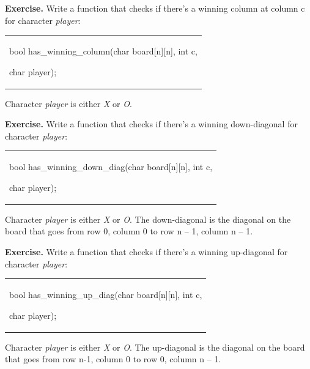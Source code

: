 \textbf{Exercise.} Write a function that checks if there's a winning
column at column c for character \emph{player}:

\begin{longtable}[]{@{}
  >{\raggedright\arraybackslash}p{}@{}}
\toprule\noalign{}
 \\
\midrule\noalign{}
\endhead
\bottomrule\noalign{}
\endlastfoot
bool has\_winning\_column(char board{[}n{]}{[}n{]}, int c,

char player); \\
\end{longtable}

Character \emph{player} is either
\emph{\textquotesingle X\textquotesingle{}} or
\emph{\textquotesingle O\textquotesingle{}}.

\textbf{Exercise.} Write a function that checks if there's a winning
down-diagonal for character \emph{player}:

\begin{longtable}[]{@{}
  >{\raggedright\arraybackslash}p{}@{}}
\toprule\noalign{}
 \\
\midrule\noalign{}
\endhead
\bottomrule\noalign{}
\endlastfoot
bool has\_winning\_down\_diag(char board{[}n{]}{[}n{]}, int c,

char player); \\
\end{longtable}

Character \emph{player} is either
\emph{\textquotesingle X\textquotesingle{}} or
\emph{\textquotesingle O\textquotesingle{}}. The down-diagonal is the
diagonal on the board that goes from row 0, column 0 to row n -- 1,
column n -- 1.

\textbf{Exercise.} Write a function that checks if there's a winning
up-diagonal for character \emph{player}:

\begin{longtable}[]{@{}
  >{\raggedright\arraybackslash}p{}@{}}
\toprule\noalign{}
 \\
\midrule\noalign{}
\endhead
\bottomrule\noalign{}
\endlastfoot
bool has\_winning\_up\_diag(char board{[}n{]}{[}n{]}, int c,

char player); \\
\end{longtable}

Character \emph{player} is either
\emph{\textquotesingle X\textquotesingle{}} or
\emph{\textquotesingle O\textquotesingle{}}. The up-diagonal is the
diagonal on the board that goes from row n-1, column 0 to row 0, column
n -- 1.

